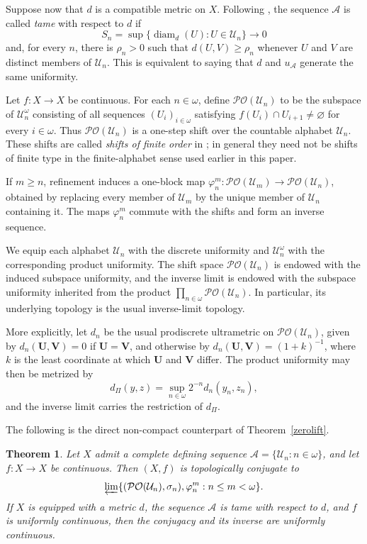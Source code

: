 \documentclass[12pt]{amsart}
\newtheorem{theorem}{Theorem}[section]
\theoremstyle{definition}
\numberwithin{equation}{section}
\theoremstyle{remark}
\begin{document}
Suppose now that $d$ is a compatible metric on $X$. Following
\cite{Darji}, the sequence $\mathcal A$ is called \emph{tame} with respect
to $d$ if
\[
S_n=\sup\{\operatorname{diam}_d(U):U\in\mathcal U_n\}\longrightarrow 0
\]
and, for every $n$, there is $\rho_n>0$ such that
$d(U,V)\geq\rho_n$ whenever $U$ and $V$ are distinct members of
$\mathcal U_n$. This is equivalent to saying that $d$ and
$u_{\mathcal A}$ generate the same uniformity.

Let $f:X\to X$ be continuous. For each $n\in\omega$, define
$\mathcal{PO}(\mathcal U_n)$ to be the subspace of
$\mathcal U_n^\omega$ consisting of all sequences
$(U_i)_{i\in\omega}$ satisfying
$f(U_i)\cap U_{i+1}\neq\varnothing$ for every $i\in\omega$.
Thus $\mathcal{PO}(\mathcal U_n)$ is a one-step shift over the countable
alphabet $\mathcal U_n$. These shifts are called \emph{shifts of finite order} in
\cite{Darji}; in general they need not be shifts of finite type in the
finite-alphabet sense used earlier in this paper.

If $m\geq n$, refinement induces a one-block map
$\varphi_n^m:\mathcal{PO}(\mathcal U_m)\to
\mathcal{PO}(\mathcal U_n)$, obtained by replacing every member of
$\mathcal U_m$ by the unique member of $\mathcal U_n$ containing it. The
maps $\varphi_n^m$ commute with the shifts and form an inverse sequence.

We equip each alphabet $\mathcal U_n$ with the discrete uniformity and
$\mathcal U_n^\omega$ with the corresponding product uniformity. The shift
space $\mathcal{PO}(\mathcal U_n)$ is endowed with the induced subspace
uniformity, and the inverse limit is endowed with the subspace uniformity
inherited from the product $\prod_{n\in\omega}\mathcal{PO}(\mathcal U_n)$.
In particular, its underlying topology is the usual inverse-limit topology.

More explicitly, let $d_n$ be the usual prodiscrete ultrametric on
$\mathcal{PO}(\mathcal U_n)$, given by $d_n(\mathbf U, \mathbf V)=0$ if
$\mathbf U= \mathbf V$, and otherwise by
$d_n(\mathbf U, \mathbf V)=(1+k)^{-1}$, where $k$ is the least coordinate at
which $\mathbf U$ and $\mathbf V$ differ. The product uniformity may then be
metrized by
\[
d_{\Pi}(y,z)=\sup_{n\in\omega}2^{-n}d_n(y_n,z_n),
\]
and the inverse limit carries the restriction of $d_{\Pi}$.

The following is the direct non-compact counterpart of
Theorem~\ref{zerolift}.

\begin{theorem}\label{thm:nonarch-representation}
Let $X$ admit a complete defining sequence
$\mathcal A=\{\mathcal U_n:n\in\omega\}$, and let $f:X\to X$ be continuous.
Then $(X,f)$ is topologically conjugate to
\[
\varprojlim
\{(\mathcal{PO}(\mathcal U_n),\sigma_n),\varphi_n^m:
n\leq m<\omega\}.
\]
If $X$ is equipped with a metric $d$, the sequence $\mathcal A$ is tame
with respect to $d$, and $f$ is uniformly continuous, then the conjugacy
and its inverse are uniformly continuous.
\end{theorem}
\end{document}
